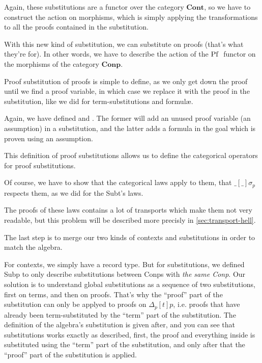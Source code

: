 \documentclass[10pt,a4paper]{article}
\begin{document}
			Again, these substitutions are a functor over the category $\textbf{Cont}$, so we have to construct the action on morphisms, which is simply applying the transformations to all the proofs contained in the substitution.
			
			\begin{tcolorbox}
				\agdasep
				\agdasep
			\end{tcolorbox}
		
			With this new kind of substitution, we can substitute on proofs (that's what they're for). In other words, we have to describe the action of the $\operatorname{Pf}\;$ functor on the morphisms of the category $\textbf{Conp}$.
			
			Proof substitution of proofs is simple to define, as we only get down the proof until we find a proof variable, in which case we replace it with the proof in the substitution, like we did for term-substitutions and formulæ.
			
			Again, we have defined  and . The former will add an unused proof variable (an assumption) in a substitution, and the latter adds a formula in the goal which is proven using an assumption.
		
			\begin{tcolorbox}
				\agda{agda/FFOL-I-26.tex}
			\end{tcolorbox}
		
			This definition of proof substitutions allows us to define the categorical operators for proof substitutions. 
		
			Of course, we have to show that the categorical laws apply to them, that $\_[\_]\sigma_p$ respects them, as we did for the Subt's laws.
			
			The proofs of these laws contains a lot of transports which make them not very readable, but this problem will be described more precisly in \autoref{sec:transport-hell}.
			
			\begin{tcolorbox}
				\agda{agda/FFOL-I-27.tex}
			\end{tcolorbox}
		
			The last step is to merge our two kinds of contexts and substitutions in order to match the algebra.
			
			For contexts, we simply have a record type. But for substitutions, we defined Subp to only describe substitutions between Conp{\footnotesize s} with \emph{the same Conp}. Our solution is to understand global substitutions as a sequence of two substitutions, first on terms, and then on proofs. That's why the \enquote{proof} part of the substitution can only be applyed to proofs on $\Delta_p [t]p$, i.e. proofs that have already been term-substituted by the \enquote{term} part of the substitution. The definition of the algebra's substitution is given after, and you can see that substitutions works exactly as described, first, the proof and everything inside is substituted using the \enquote{term} part of the substitution, and only after that the \enquote{proof} part of the substitution is applied.
		
\end{document}
